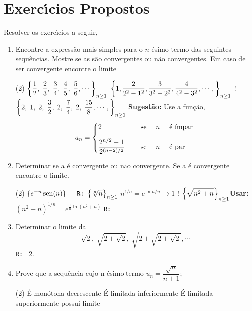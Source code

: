 \section*{Exerc\'{\i}cios Propostos}
Resolver os exerc\'{\i}cios a seguir,
\begin{enumerate}[label=\rm{(\arabic*)},ref=\rm{(\arabic*)}]
\item Encontre a express\~{a}o mais simples para o $n$-\'{e}simo termo das
  seguintes sequ\^{e}ncias. Mostre se as \seqs s\~{a}o convergentes ou n\~{a}o
  convergentes. Em caso de ser convergente encontre o limite
\begin{tasks}[label=\rm{(\alph*)},item-indent=4em,label-width=4ex,ref=\rm{(\alph*)}](2)
\task $\displaystyle{\left\{\frac{1}{2},\;\frac{2}{3},\; \frac{3}{4},\; \frac{4}{5},\; \frac{5}{6},\cdots\right\}_{n\geq 1}}$
\task  $\displaystyle{\left\{1,\frac{2}{2^2-1^2},\frac{3}{3^2-2^2},\frac{4}{4^2-3^2},\cdots,\right\}_{n\geq 1}}$
\task! $\displaystyle{\left\{2,\; 1,\; 2,\; \frac{3}{2},\; 2,\; \frac{7}{4},\; 2,\; \frac{15}{8},\cdots,\right\}_{n\geq 1}}$
\textbf{Sugest\~{a}o:} Use a fun\c{c}\~{a}o,
\begin{equation*}
  a_{n}=
  \begin{cases}
    2 & \quad \text{ se }\quad n\quad \text{ \'{e} \'{\i}mpar }\\[2ex]
    \dfrac{2^{n/2}-1}{2^{(n-2)/2}} &\quad  \text{ se }\quad n \quad  \text{ \'{e} par }
  \end{cases}
\end{equation*}
\end{tasks}

\item Determinar se a \seq \'{e} convergente ou n\~{a}o convergente. Se a \seq \'{e} convergente encontre o limite.
\begin{tasks}[label=\rm{(\alph*)},item-indent=3em,label-width=4ex,ref=\rm{(\alph*)}](2)
 \task \(\{e^{-n}\operatorname{sen}(n)\} \quad\texttt{ R:}\)
 \task  \(\displaystyle{\left\{\sqrt[n]{n}\right\}_{n\geq 1}}\)\quad  {} \(n^{1/n}=e^{\ln n/n}\to 1\)
 \task! \(\displaystyle{\left\{\sqrt{n^2+n}\right\}_{n\geq 1}}\)\quad \textbf{Usar:} \((n^2+n)^{1/n}=e^{\frac{1}{n}\ln(n^2+n)}\)
 \quad \texttt{R:}
\end{tasks}

\item Determinar o limite da \seq
\begin{equation*}
  \sqrt{2},\; \sqrt{2+\sqrt{2}},\; \sqrt{2+\sqrt{2+\sqrt{2}}},\cdots
\end{equation*}
\hfill  \texttt{R: } 2.
\item Prove que a sequ\^encia cujo n-\'esimo termo $\displaystyle{u_n=\dfrac{\sqrt{n}}{n+1}}$;
\begin{tasks}[label=\rm{(\alph*)},item-indent=4em,label-width=4ex,ref=\rm{(\alph*)}](2)
 \task  \textrm{\'E mon\'otona decrescente}
 \task  \textrm{\'E limitada inferiormente}
 \task  \textrm{\'E limitada superiormente}
 \task  \textrm{possui limite}
\end{tasks}


\end{enumerate}
